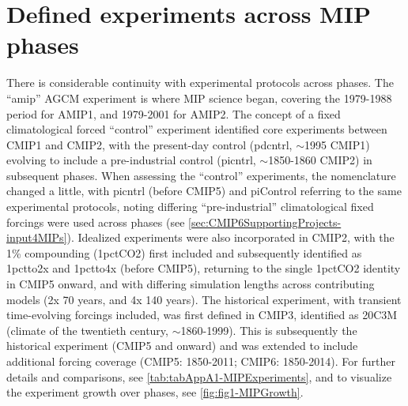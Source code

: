 \documentclass[manuscript]{copernicus}
\begin{document}


\appendix
\section{Defined experiments across MIP phases}  %
\label{sec:secAppA1-MIPExperiments}
There is considerable continuity with experimental protocols across phases. The ``amip'' AGCM experiment is where MIP science began, covering the 1979-1988 period for AMIP1, and 1979-2001 for AMIP2. The concept of a fixed climatological forced ``control'' experiment identified core experiments between CMIP1 and CMIP2, with the present-day control (pdcntrl, $\sim$1995 CMIP1) evolving to include a pre-industrial control (picntrl, $\sim$1850-1860 CMIP2) in subsequent phases. When assessing the ``control'' experiments, the nomenclature changed a little, with picntrl (before CMIP5) and piControl referring to the same experimental protocols, noting differing ``pre-industrial'' climatological fixed forcings were used across phases (see \autoref{sec:CMIP6SupportingProjects-input4MIPs}). Idealized experiments were also incorporated in CMIP2, with the 1\% compounding (1pctCO2) first included and subsequently identified as 1pctto2x and 1pctto4x (before CMIP5), returning to the single 1pctCO2 identity in CMIP5 onward, and with differing simulation lengths across contributing models (2x 70 years, and 4x 140 years). The historical experiment, with transient time-evolving forcings included, was first defined in CMIP3, identified as 20C3M (climate of the twentieth century, $\sim$1860-1999). This is subsequently the historical experiment (CMIP5 and onward) and was extended to include additional forcing coverage (CMIP5: 1850-2011; CMIP6: 1850-2014). For further details and comparisons, see \autoref{tab:tabAppA1-MIPExperiments}, and to visualize the experiment growth over phases, see \autoref{fig:fig1-MIPGrowth}.
\end{document}
